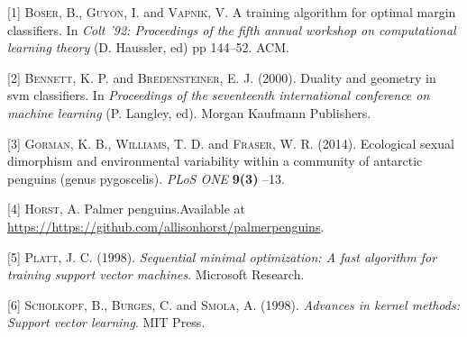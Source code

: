 \documentclass[
]{article}
\newenvironment{cslreferences}%
  {}%
  {\par}
\begin{document}
\hypertarget{refs}{}
\begin{cslreferences}
\leavevmode\hypertarget{ref-vapnik92}{}%
{[}1{]} \textsc{Boser}, B., \textsc{Guyon}, I. and \textsc{Vapnik}, V. A
training algorithm for optimal margin classifiers. In \emph{Colt '92:
Proceedings of the fifth annual workshop on computational learning
theory} (D. Haussler, ed) pp 144--52. ACM.

\leavevmode\hypertarget{ref-bennettDuality}{}%
{[}2{]} \textsc{Bennett}, K. P. and \textsc{Bredensteiner}, E. J.
(2000). Duality and geometry in svm classifiers. In \emph{Proceedings of
the seventeenth international conference on machine learning} (P.
Langley, ed). Morgan Kaufmann Publishers.

\leavevmode\hypertarget{ref-penguins}{}%
{[}3{]} \textsc{Gorman}, K. B., \textsc{Williams}, T. D. and
\textsc{Fraser}, W. R. (2014). Ecological sexual dimorphism and
environmental variability within a community of antarctic penguins
(genus pygoscelis). \emph{PLoS ONE} \textbf{9(3)} --13.

\leavevmode\hypertarget{ref-penguindata}{}%
{[}4{]} \textsc{Horst}, A. Palmer penguins.Available at
\url{https://https://github.com/allisonhorst/palmerpenguins}.

\leavevmode\hypertarget{ref-plattSMO}{}%
{[}5{]} \textsc{Platt}, J. C. (1998). \emph{Sequential minimal
optimization: A fast algorithm for training support vector machines}.
Microsoft Research.

\leavevmode\hypertarget{ref-KernelMethodAdvances}{}%
{[}6{]} \textsc{Schölkopf}, B., \textsc{Burges}, C. and \textsc{Smola},
A. (1998). \emph{Advances in kernel methods: Support vector learning}.
MIT Press.
\end{cslreferences}
\end{document}

